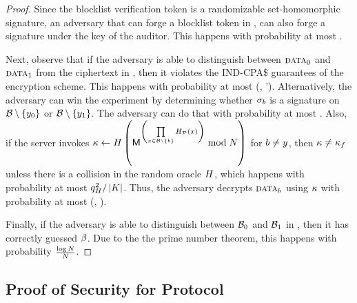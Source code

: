 \begin{proof}
Since the blocklist verification token is a randomizable set-homomorphic signature, an adversary that can forge a blocklist token in \unforgeBlocklistExp, can also forge a signature under the key of the auditor. This happens with probability at most \ufcmaAdv. 

Next, observe that if the adversary is able to distinguish between $\clientData_0$ and $\clientData_1$ from the ciphertext \cOutputFile in \hidingContentExp, then it violates the IND-CPA\$ guarantees of the encryption scheme. This happens with probability at most  \Advantage{\indcpaRandLabel}{\encryptionSchemeDefn}(\timeBound, 
		\oracleQueries'). Alternatively, the adversary can win the experiment by determining whether $\genericSig[\indBit]$ is a signature on $\blocklist \setminus \{\genericCInputElmt{0} \} $ or $\blocklist \setminus \{\genericCInputElmt{1} \} $. The adversary can do that with probability at most \indsrAdv. Also, if the server invokes $\genericSymmKey \assign \ro\left(\cOutputMeta^{\left(\prod\limits_{\genericFnInput \in \blocklist \setminus \{\genericBlocklistElmt\}}\primeRO(\genericFnInput)\right)} \bmod \rsaMod \right)$ for $\genericBlocklistElmt \neq \genericCInputElmt$, then $\kappa \neq \kappa_{f}$  unless there is a collision in the random oracle $H$, which happens with probability at most $q_H^{2}/\left|{K}\right|$. Thus, the adversary decrypts $\clientData_\indBit$ using $\kappa$ with probability at most \Advantage{\cciLabel}{\encryptionSchemeDefn}(\timeBound, \oracleQueries).


Finally, if the adversary is able to distinguish between $\blocklist_0$ and $\blocklist_1$ in \hidingBlocklistExp, then it has correctly guessed $\beta$. Due to the the prime number theorem, this happens with probability $\frac{\log N}{N}$.

\end{proof}



\subsection{Proof of Security for Protocol \protocolFM}
\label{sec:proof:fm}
%


